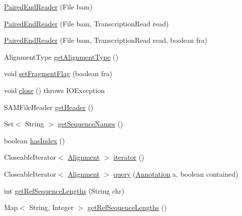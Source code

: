 \begin{DoxyCompactItemize}
\item 
\hyperlink{classumms_1_1core_1_1readers_1_1_paired_end_reader_af2b50ac1dacc861de37aaa5a6c9f9bc3}{Paired\+End\+Reader} (File bam)
\item 
\hyperlink{classumms_1_1core_1_1readers_1_1_paired_end_reader_a96ba61552e211e291175ea1ad4d5b298}{Paired\+End\+Reader} (File bam, Transcription\+Read read)
\item 
\hyperlink{classumms_1_1core_1_1readers_1_1_paired_end_reader_a3697137ca20657cdb8e4e550e6eb334a}{Paired\+End\+Reader} (File bam, Transcription\+Read read, boolean fra)
\item 
Alignment\+Type \hyperlink{classumms_1_1core_1_1readers_1_1_paired_end_reader_a6ad57c4efb2f14b5639d384b39ef5ca9}{get\+Alignment\+Type} ()
\item 
void \hyperlink{classumms_1_1core_1_1readers_1_1_paired_end_reader_aaeab070b5abd537741ffcd9d3a51ed88}{set\+Fragment\+Flag} (boolean fra)
\item 
void \hyperlink{classumms_1_1core_1_1readers_1_1_paired_end_reader_a042b674540f796c0631213592b167448}{close} ()  throws I\+O\+Exception 
\item 
S\+A\+M\+File\+Header \hyperlink{classumms_1_1core_1_1readers_1_1_paired_end_reader_a0053947945b1d82abb79ab943c78e0e9}{get\+Header} ()
\item 
Set$<$ String $>$ \hyperlink{classumms_1_1core_1_1readers_1_1_paired_end_reader_a3126e03ea603485ecd7eb0f8dc3381a1}{get\+Sequence\+Names} ()
\item 
boolean \hyperlink{classumms_1_1core_1_1readers_1_1_paired_end_reader_a4a619c059deea10d30eff2772cea317b}{has\+Index} ()
\item 
Closeable\+Iterator$<$ \hyperlink{interfaceumms_1_1core_1_1alignment_1_1_alignment}{Alignment} $>$ \hyperlink{classumms_1_1core_1_1readers_1_1_paired_end_reader_ab050bf528b5fe9e7b2011ba41d41e9cc}{iterator} ()
\item 
Closeable\+Iterator$<$ \hyperlink{interfaceumms_1_1core_1_1alignment_1_1_alignment}{Alignment} $>$ \hyperlink{classumms_1_1core_1_1readers_1_1_paired_end_reader_ae312b03d46913edc1082f184d47baf82}{query} (\hyperlink{interfaceumms_1_1core_1_1annotation_1_1_annotation}{Annotation} a, boolean contained)
\item 
int \hyperlink{classumms_1_1core_1_1readers_1_1_paired_end_reader_ae867912b0cab94b20481eee1eb5390b8}{get\+Ref\+Sequence\+Lengths} (String chr)
\item 
Map$<$ String, Integer $>$ \hyperlink{classumms_1_1core_1_1readers_1_1_paired_end_reader_a43aff465a170901ce11a079f921065a1}{get\+Ref\+Sequence\+Lengths} ()
\end{DoxyCompactItemize}
